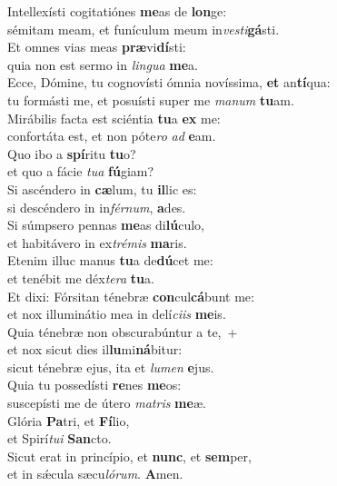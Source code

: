 \evenverse Intellexísti cogitatiónes \textbf{me}as de \textbf{lon}ge:~\*\\
\evenverse sémitam meam, et funículum meum in\textit{ve}\textit{sti}\textbf{gá}sti.\\
\oddverse Et omnes vias meas \textbf{præ}vi\textbf{dí}sti:~\*\\
\oddverse quia non est sermo in \textit{lin}\textit{gua} \textbf{me}a.\\
\evenverse Ecce, Dómine, tu cognovísti ómnia novíssima, \textbf{et} an\textbf{tí}qua:~\*\\
\evenverse tu formásti me, et posuísti super me \textit{ma}\textit{num} \textbf{tu}am.\\
\oddverse Mirábilis facta est sciéntia \textbf{tu}a \textbf{ex} me:~\*\\
\oddverse confortáta est, et non póte\textit{ro} \textit{ad} \textbf{e}am.\\
\evenverse Quo ibo a \textbf{spí}ritu \textbf{tu}o?~\*\\
\evenverse et quo a fácie \textit{tu}\textit{a} \textbf{fú}giam?\\
\oddverse Si ascéndero in \textbf{cæ}lum, tu \textbf{il}lic es:~\*\\
\oddverse si descéndero in in\textit{fér}\textit{num}, \textbf{a}des.\\
\evenverse Si súmpsero pennas \textbf{me}as di\textbf{lú}culo,~\*\\
\evenverse et habitávero in ex\textit{tré}\textit{mis} \textbf{ma}ris.\\
\oddverse Etenim illuc manus \textbf{tu}a de\textbf{dú}cet me:~\*\\
\oddverse et tenébit me déx\textit{te}\textit{ra} \textbf{tu}a.\\
\evenverse Et dixi: Fórsitan ténebræ \textbf{con}cul\textbf{cá}bunt me:~\*\\
\evenverse et nox illuminátio mea in delí\textit{ci}\textit{is} \textbf{me}is.\\
\oddverse Quia ténebræ non obscurabúntur a te,~+\\
\oddverse  et nox sicut dies il\textbf{lu}mi\textbf{ná}bitur:~\*\\
\oddverse sicut ténebræ ejus, ita et \textit{lu}\textit{men} \textbf{e}jus.\\
\evenverse Quia tu possedísti \textbf{re}nes \textbf{me}os:~\*\\
\evenverse suscepísti me de útero \textit{ma}\textit{tris} \textbf{me}æ.\\
\oddverse Glória \textbf{Pa}tri, et \textbf{Fí}lio,~\*\\
\oddverse et Spirí\textit{tu}\textit{i} \textbf{San}cto.\\
\evenverse Sicut erat in princípio, et \textbf{nunc}, et \textbf{sem}per,~\*\\
\evenverse et in sǽcula sæcu\textit{ló}\textit{rum}. \textbf{A}men.\\
